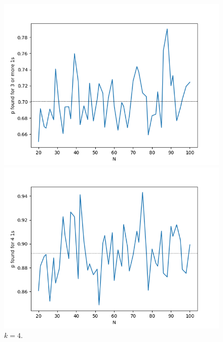 \begin{figure}[!hbt]
            \begin{minipage}{.33\linewidth}
              \centering
                \includegraphics[width = \textwidth]{./images/game2/0111_L_vs_p_MAX_L50-5100.png}
              \caption{$k = 3$.}
              \label{figure-k3}
            \end{minipage}      
            \begin{minipage}{.33\linewidth}
              \centering
                \includegraphics[width = \textwidth]{./images/game2/1111_L_vs_p_MAX_L50-5100.png}
              \caption{$k = 4$.}
              \label{figure-k4}
            \end{minipage}                     
        \end{figure} 


